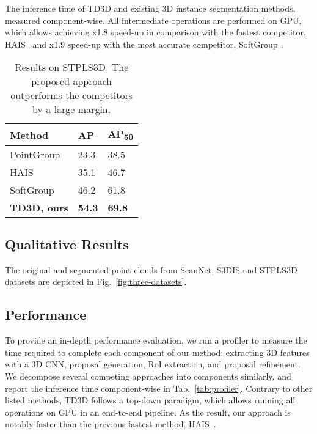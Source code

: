 \documentclass[10pt,twocolumn,letterpaper]{article}
\begin{document}
\begin{table*}[h!]
\caption{The inference time of TD3D and existing 3D instance segmentation methods, measured component-wise. All intermediate operations are performed on GPU, which allows achieving x1.8 speed-up in comparison with the fastest competitor, HAIS~\cite{chen2021hierarchical} and x1.9 speed-up with the most accurate competitor, SoftGroup~\cite{vu2022softgroup}.}
\label{tab:profiler}
\end{table*}

\begin{table}[h!]
\centering
\begin{tabular}{lll}
\toprule
Method     & AP  & AP\textsubscript{50} \\
\midrule
PointGroup & 23.3 & 38.5  \\
HAIS       & 35.1 & 46.7  \\
SoftGroup  & 46.2 & 61.8  \\
\textbf{TD3D, ours}       & \textbf{54.3} & \textbf{69.8} \\
\bottomrule
\end{tabular}
\caption{Results on STPLS3D. The proposed approach outperforms the competitors by a large margin.}
\label{tab:results-stpls3d}
\end{table}

\subsection{Qualitative Results}
\label{ssec:qualitative}

The original and segmented point clouds from ScanNet, S3DIS and STPLS3D datasets are depicted in Fig.~\ref{fig:three-datasets}.

\subsection{Performance}
\label{ssec:performance}

To provide an in-depth performance evaluation, we run a profiler to measure the time required to complete each component of our method: extracting 3D features with a 3D CNN, proposal generation, RoI extraction, and proposal refinement. We decompose several competing approaches into components similarly, and report the inference time component-wise in Tab.~\ref{tab:profiler}. Contrary to other listed methods, TD3D follows a top-down paradigm, which allows running all operations on GPU in an end-to-end pipeline. As the result, our approach is notably faster than the previous fastest method, HAIS~\cite{chen2021hierarchical}.
\end{document}
